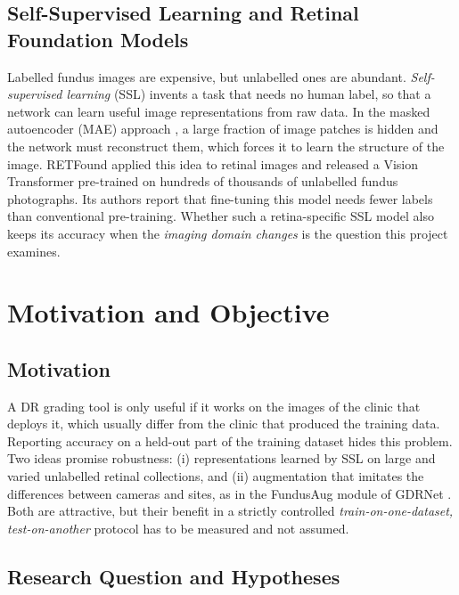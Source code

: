 \subsection{Self-Supervised Learning and Retinal Foundation Models}
\label{subsec:ssl_bg}

Labelled fundus images are expensive, but unlabelled ones are abundant. \emph{Self-supervised learning} (SSL) invents a task that needs no human label, so that a network can learn useful image representations from raw data. In the masked autoencoder (MAE) approach \cite{mae2022}, a large fraction of image patches is hidden and the network must reconstruct them, which forces it to learn the structure of the image. RETFound \cite{retfound2023} applied this idea to retinal images and released a Vision Transformer \cite{vit2021} pre-trained on hundreds of thousands of unlabelled fundus photographs. Its authors report that fine-tuning this model needs fewer labels than conventional pre-training. Whether such a retina-specific SSL model also keeps its accuracy when the \emph{imaging domain changes} is the question this project examines.

\section{Motivation and Objective}
\label{sec:motivation_objective}

\subsection{Motivation}
\label{subsec:motivation}

A DR grading tool is only useful if it works on the images of the clinic that deploys it, which usually differ from the clinic that produced the training data. Reporting accuracy on a held-out part of the training dataset hides this problem. Two ideas promise robustness: (i) representations learned by SSL on large and varied unlabelled retinal collections, and (ii) augmentation that imitates the differences between cameras and sites, as in the FundusAug module of GDRNet \cite{gdrnet2023}. Both are attractive, but their benefit in a strictly controlled \emph{train-on-one-dataset, test-on-another} protocol has to be measured and not assumed.

\subsection{Research Question and Hypotheses}
\label{subsec:research_question}

